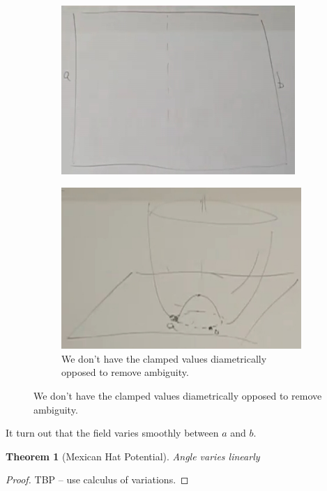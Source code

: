 \documentclass[]{article}
\newtheorem{thm}{Theorem}
\begin{document}
\begin{figure}[H]
\begin{subfigure}[t]{0.5\textwidth}
		\includegraphics[width=\textwidth]{2-7-V-quartic-domain-wall-ab}
	\end{subfigure}
	\begin{subfigure}[t]{0.5\textwidth}
		\caption{We don't have the clamped values diametrically opposed to remove ambiguity.}\label{fig:2-7-V-quartic-domain-wall}
		\includegraphics[width=\textwidth]{2-7-V-quartic-domain-wall}
	\end{subfigure}
\end{figure}

It turn out that the field varies smoothly between $a$ and $b$.

\begin{thm}[Mexican Hat Potential]
	Angle varies linearly
\end{thm}
\begin{proof}
	TBP -- use calculus of variations.
\end{proof}
\end{document}
